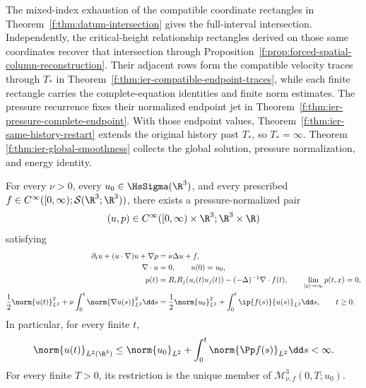 The mixed-index exhaustion of the compatible coordinate rectangles in
Theorem~\ref{f:thm:datum-intersection} gives the full-interval intersection.
Independently, the critical-height relationship rectangles derived on those
same coordinates recover that intersection through
Proposition~\ref{f:prop:forced-spatial-column-reconstruction}.
Their adjacent rows form the compatible velocity traces through \(T_*\) in
Theorem~\ref{f:thm:ier-compatible-endpoint-traces}, while each finite rectangle
carries the complete-equation identities and finite norm estimates.  The pressure
recurrence fixes their normalized endpoint jet in
Theorem~\ref{f:thm:ier-pressure-complete-endpoint}.  With those endpoint
values, Theorem~\ref{f:thm:ier-same-history-restart} extends the original
history past \(T_*\), so \(T_*=\infty\).  Theorem
\ref{f:thm:ier-global-smoothness} collects the global solution, pressure
normalization, and energy identity.

\begin{samepage}
\begin{theorem}
\label{f:thm:ier-global-smoothness}
For every \(\nu>0\), every \(u_0\in\HsSigma(\R^3)\), and every prescribed
\(f\in C^\infty([0,\infty);\mathcal S(\R^3;\R^3))\), there exists a
pressure-normalized pair
\begin{equation}
 (u,p)\in C^\infty([0,\infty)\times\R^3;\R^3\times\R)
 \label{f:eq:ier-global-class}
\end{equation}
satisfying
\begin{align}
 \partial_tu+(u\cdot\nabla)u+\nabla p&=\nu\Delta u+f,
 \label{f:eq:ier-global-momentum}\\
 \nabla\cdot u&=0,
 \qquad u(0)=u_0,
 \label{f:eq:ier-global-divergence-datum}\\
 p(t)&=R_iR_j(u_i(t)u_j(t))-(-\Delta)^{-1}\nabla\cdot f(t),
 \qquad \lim_{|x|\to\infty}p(t,x)=0,
 \label{f:eq:ier-global-pressure}\\
 \frac12\norm{u(t)}_{L^2}^2
 +\nu\int_0^t\norm{\nabla u(s)}_{L^2}^2\dd s
 &=\frac12\norm{u_0}_{L^2}^2
 +\int_0^t\ip{f(s)}{u(s)}_{L^2}\dd s,
 \qquad t\ge0.
 \label{f:eq:ier-global-energy}
\end{align}
In particular, for every finite \(t\),
\begin{equation}
 \norm{u(t)}_{L^2(\R^3)}
 \le\norm{u_0}_{L^2}+\int_0^t\norm{\Pp f(s)}_{L^2}\dd s<\infty.
 \label{f:eq:ier-global-energy-bound}
\end{equation}
For every finite \(T>0\), its restriction is the unique member of
\(\mathscr M_{\nu,f}^3(0,T;u_0)\).
\end{theorem}
\end{samepage}

